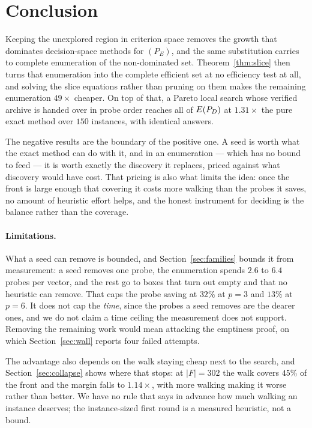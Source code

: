 \documentclass[11pt,a4paper]{article}
\begin{document}
\section{Conclusion}

Keeping the unexplored region in criterion space removes the growth that
dominates decision-space methods for $(P_E)$, and the same substitution carries
to complete enumeration of the non-dominated set.
Theorem~\ref{thm:slice} then turns that enumeration into the complete efficient
set at no efficiency test at all, and solving the slice equations rather than
pruning on them makes the remaining enumeration $49\times$ cheaper.  On top of
that, a Pareto local search whose verified archive is handed over in probe
order reaches all of $E(P_{D})$ at $1.31\times$ the pure exact method over $150$
instances, with identical answers.

The negative results are the boundary of the positive one.  A seed is worth
what the exact method can do with it, and in an enumeration --- which has no
bound to feed --- it is worth exactly the discovery it replaces, priced against
what discovery would have cost.  That pricing is also what limits the idea:
once the front is large enough that covering it costs more walking than the
probes it saves, no amount of heuristic effort helps, and the honest
instrument for deciding is the balance rather than the coverage.

\paragraph{Limitations.}  What a seed can remove is bounded, and
Section~\ref{sec:families} bounds it from measurement: a seed removes one
probe, the enumeration spends $2.6$ to $6.4$ probes per vector, and the rest
go to boxes that turn out empty and that no heuristic can remove.  That caps
the probe saving at $32\%$ at $p=3$ and $13\%$ at $p=6$.  It does not cap the
\emph{time}, since the probes a seed removes are the dearer ones, and we do not
claim a time ceiling the measurement does not support.  Removing the remaining
work would mean attacking the emptiness proof, on which
Section~\ref{sec:wall} reports four failed attempts.

The advantage also depends on the walk staying
cheap next to the search, and Section~\ref{sec:collapse} shows where that
stops: at $|F| = 302$ the walk covers $45\%$ of the front and the margin falls
to $1.14\times$, with more walking making it worse rather than better.  We
have no rule that says in advance how much walking an instance deserves; the
instance-sized first round is a measured heuristic, not a bound.
\end{document}
